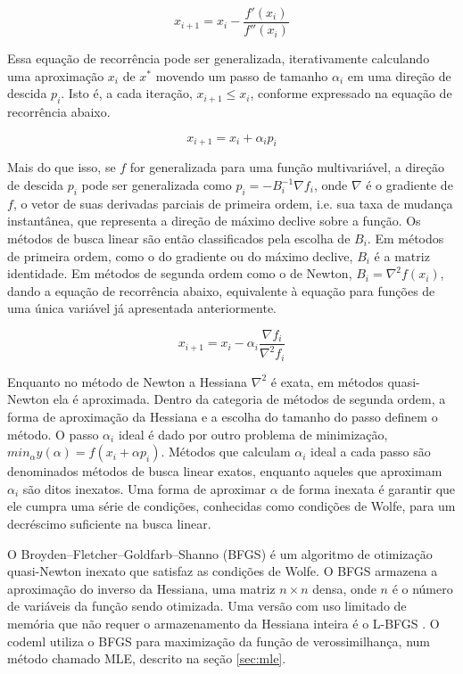 \documentclass[cic,tc]{iiufrgs}
\begin{document}
$$ x_{i + 1} = x_i - \frac{f'(x_i)}{f''(x_i)} $$

Essa equação de recorrência pode ser generalizada, iterativamente calculando
uma aproximação $x_i$ de $x^*$ movendo um passo de tamanho $\alpha_i$ em uma
direção de descida $p_i$. Isto é, a cada iteração, $x_{i+1} \le x_i$, conforme
expressado na equação de recorrência abaixo.

$$ x_{i + 1} = x_i + \alpha_i p_i $$

Mais do que isso, se $f$ for generalizada para uma função multivariável, a
direção de descida $p_i$ pode ser generalizada como $p_i = -B_{i}^{-1} \nabla
f_i$, onde $\nabla$ é o gradiente de $f$, o vetor de suas derivadas parciais de
primeira ordem, i.e. sua taxa de mudança instantânea, que representa a direção
de máximo declive sobre a função. Os métodos de busca linear são então
classificados pela escolha de $B_i$. Em métodos de primeira ordem, como o do
gradiente ou do máximo declive, $B_i$ é a matriz identidade. Em métodos de
segunda ordem como o de Newton, $B_i = \nabla^2 f(x_i)$, dando a equação de
recorrência abaixo, equivalente à equação para funções de uma única variável já
apresentada anteriormente.

$$ x_{i + 1} = x_i - \alpha_i \frac{\nabla f_i}{\nabla^2 f_i} $$

Enquanto no método de Newton a Hessiana $\nabla^2$ é exata, em métodos
quasi-Newton ela é aproximada. Dentro da categoria de métodos de segunda ordem,
a forma de aproximação da Hessiana e a escolha do tamanho do passo definem o
método. O passo $\alpha_i$ ideal é dado por outro problema de minimização,
$min_\alpha y(\alpha) = f(x_i + \alpha p_i)$. Métodos que calculam $\alpha_i$
ideal a cada passo são denominados métodos de busca linear exatos, enquanto
aqueles que aproximam $\alpha_i$ são ditos inexatos. Uma forma de aproximar
$\alpha$ de forma inexata é garantir que ele cumpra uma série de condições,
conhecidas como condições de Wolfe, para um decréscimo suficiente na busca
linear.

O Broyden–Fletcher–Goldfarb–Shanno (BFGS) \cite{fletcher1980practical} é um
algoritmo de otimização quasi-Newton inexato que satisfaz as condições de
Wolfe. O BFGS armazena a aproximação do inverso da Hessiana, uma matriz $n
\times n$ densa, onde $n$ é o número de variáveis da função sendo otimizada.
Uma versão com uso limitado de memória que não requer o armazenamento da
Hessiana inteira é o L-BFGS \cite{liu1989limited}. O codeml utiliza o BFGS para
maximização da função de verossimilhança, num método chamado MLE, descrito na
seção \ref{sec:mle}.
\end{document}

